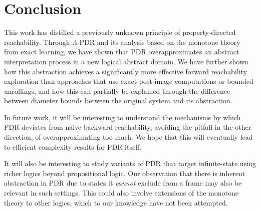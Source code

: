 \documentclass[acmsmall,screen]{acmart}
\begin{document}
%
\iflong\else
\pagebreak
\fi
\section{Conclusion}
\label{sec:conclusion}
This work has distilled a previously unknown principle of property-directed reachability.
Through $\Lambda$-PDR and its analysis based on the monotone theory from exact learning, we have shown that PDR overapproximates an abstract interpretation process in a new logical abstract domain.
%
We have further shown how this abstraction achieves a significantly more effective forward reachability exploration than approaches that use exact post-image computations or bounded unrollings, and how this can partially be explained through the difference between diameter bounds between the original system and its abstraction.

In future work, it will be interesting to understand the mechanisms by which PDR deviates from naive backward reachability, avoiding the pitfall in the other direction, of overapproximating too much.
We hope that this will eventually lead to efficient complexity results for PDR itself. 
\begin{changebar}
It will also be interesting to study variants of PDR that target infinite-state using richer logics beyond propositional logic. Our observation that there is inherent abstraction in PDR due to states it \emph{cannot} exclude from a frame may also be relevant in such settings. This could also involve extensions of the monotone theory to other logics, which to our knowledge have not been attempted.
\end{changebar}

%
%
%
%
%
%
%
%
%
%
 
%
\begin{acks}
\iflong
{}
\fi
\end{acks} 

%
%
%
%
%
%
%
%
%
%
%
%
%
%
%
%


%
%

\end{document}
